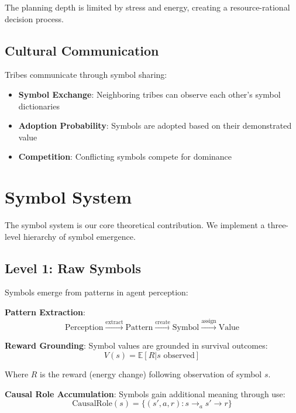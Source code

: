 \documentclass[11pt,a4paper]{article}
\begin{document}
The planning depth is limited by stress and energy, creating a resource-rational decision process.

\subsection{Cultural Communication}

Tribes communicate through symbol sharing:

\begin{itemize}
    \item \textbf{Symbol Exchange}: Neighboring tribes can observe each other's symbol dictionaries
    \item \textbf{Adoption Probability}: Symbols are adopted based on their demonstrated value
    \item \textbf{Competition}: Conflicting symbols compete for dominance
\end{itemize}

\section{Symbol System}

\label{sec:symbols}

The symbol system is our core theoretical contribution. We implement a three-level hierarchy of symbol emergence.

\subsection{Level 1: Raw Symbols}

Symbols emerge from patterns in agent perception:

\textbf{Pattern Extraction}:
\begin{equation}
\text{Perception} \xrightarrow{\text{extract}} \text{Pattern} \xrightarrow{\text{create}} \text{Symbol} \xrightarrow{\text{assign}} \text{Value}
\end{equation}

\textbf{Reward Grounding}: Symbol values are grounded in survival outcomes:
\begin{equation}
V(s) = \mathbb{E}[R | s \text{ observed}]
\end{equation}

Where $R$ is the reward (energy change) following observation of symbol $s$.

\textbf{Causal Role Accumulation}: Symbols gain additional meaning through use:
\begin{equation}
\text{CausalRole}(s) = \{ (s', a, r) : s \rightarrow_a s' \rightarrow r \}
\end{equation}
\end{document}
